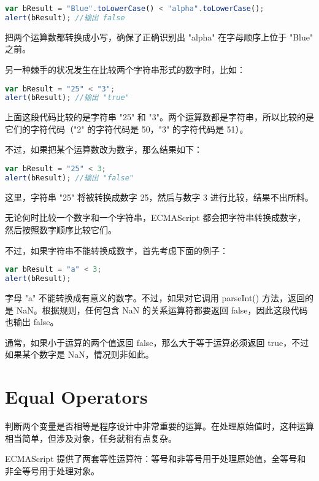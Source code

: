 \begin{lstlisting}[language=JavaScript]
var bResult = "Blue".toLowerCase() < "alpha".toLowerCase();
alert(bResult);	//输出 false
\end{lstlisting}


把两个运算数都转换成小写，确保了正确识别出 "alpha" 在字母顺序上位于 "Blue" 之前。

另一种棘手的状况发生在比较两个字符串形式的数字时，比如：


\begin{lstlisting}[language=JavaScript]
var bResult = "25" < "3";
alert(bResult);	//输出 "true"
\end{lstlisting}

上面这段代码比较的是字符串 "25" 和 "3"。两个运算数都是字符串，所以比较的是它们的字符代码（"2" 的字符代码是 50，"3" 的字符代码是 51）。

不过，如果把某个运算数改为数字，那么结果如下：

\begin{lstlisting}[language=JavaScript]
var bResult = "25" < 3;
alert(bResult);	//输出 "false"
\end{lstlisting}




这里，字符串 "25" 将被转换成数字 25，然后与数字 3 进行比较，结果不出所料。

无论何时比较一个数字和一个字符串，ECMAScript 都会把字符串转换成数字，然后按照数字顺序比较它们。

不过，如果字符串不能转换成数字，首先考虑下面的例子：


\begin{lstlisting}[language=JavaScript]
var bResult = "a" < 3;
alert(bResult);
\end{lstlisting}

字母 "a" 不能转换成有意义的数字。不过，如果对它调用 parseInt() 方法，返回的是 NaN。根据规则，任何包含 NaN 的关系运算符都要返回 false，因此这段代码也输出 false。


通常，如果小于运算的两个值返回 false，那么大于等于运算必须返回 true，不过如果某个数字是 NaN，情况则非如此。


\chapter{Equal Operators}

判断两个变量是否相等是程序设计中非常重要的运算。在处理原始值时，这种运算相当简单，但涉及对象，任务就稍有点复杂。

ECMAScript 提供了两套等性运算符：等号和非等号用于处理原始值，全等号和非全等号用于处理对象。



